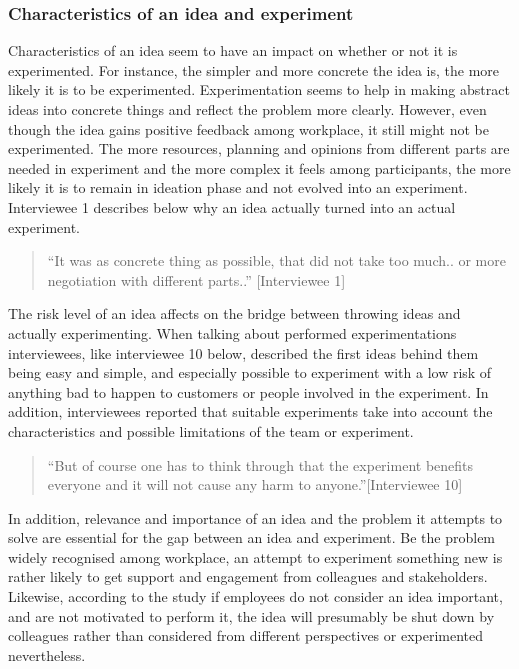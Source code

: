 \subsubsection{Characteristics of an idea and experiment}
Characteristics of an idea seem to have an impact on whether or not it is experimented. For instance, the simpler and more concrete the idea is, the more likely it is to be experimented. Experimentation seems to help in making abstract ideas into concrete things and reflect the problem more clearly. However, even though the idea gains positive feedback among workplace, it still might not be experimented. The more resources, planning and opinions from different parts are needed in experiment and the more complex it feels among participants, the more likely it is to remain in ideation phase and not evolved into an experiment.  Interviewee 1 describes below why an idea actually turned into an actual experiment.
\begin{quote}
``It was as concrete thing as possible, that did not take too much.. or more 
negotiation with different parts..'' [Interviewee 1]
\end{quote}
The risk level of an idea affects on the bridge between throwing ideas and actually experimenting. When talking about performed experimentations interviewees, like interviewee 10 below, described the first ideas behind them being easy and simple, and especially possible to experiment with a low risk of anything bad to happen to customers or people involved in the experiment. In addition, interviewees reported that suitable experiments take into account the characteristics and possible limitations of the team or experiment. 
\begin{quote}
``But of course one has to think through that the experiment benefits everyone and it will not cause any harm to anyone.''[Interviewee 10]
\end{quote}
In addition, relevance and importance of an idea and the problem it attempts to solve are essential for the gap between an idea and experiment. Be the problem widely recognised among workplace, an attempt to experiment something new is rather likely to get support and engagement from colleagues and stakeholders. Likewise, according to the study if employees do not consider an idea important, and are not motivated to perform it, the idea will presumably be shut down by colleagues rather than considered from different perspectives or experimented nevertheless. 

